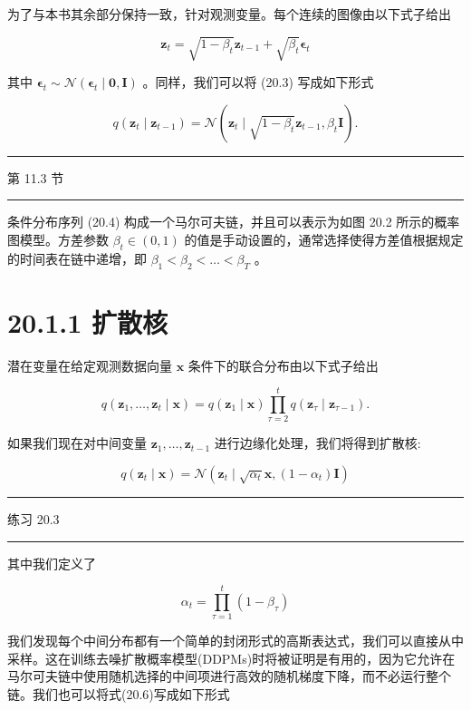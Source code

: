 \documentclass[10pt]{report}
\newcommand{\HRule}{\begin{center}\rule{0.9\linewidth}{0.2mm}\end{center}}
\begin{document}
为了与本书其余部分保持一致，针对观测变量。每个连续的图像由以下式子给出

\[
{\mathbf{z}}_{t} = \sqrt{1 - {\beta }_{t}}{\mathbf{z}}_{t - 1} + \sqrt{{\beta }_{t}}{\mathbf{\epsilon }}_{t} \tag{20.3}
\]

其中 \({\mathbf{\epsilon }}_{t} \sim  \mathcal{N}\left( {{\mathbf{\epsilon }}_{t} \mid  \mathbf{0},\mathbf{I}}\right)\) 。同样，我们可以将 (20.3) 写成如下形式

\[
q\left( {{\mathbf{z}}_{t} \mid  {\mathbf{z}}_{t - 1}}\right)  = \mathcal{N}\left( {{\mathbf{z}}_{t} \mid  \sqrt{1 - {\beta }_{t}}{\mathbf{z}}_{t - 1},{\beta }_{t}\mathbf{I}}\right) . \tag{20.4}
\]

\HRule

第 11.3 节

\HRule

条件分布序列 (20.4) 构成一个马尔可夫链，并且可以表示为如图 20.2 所示的概率图模型。方差参数 \({\beta }_{t} \in  \left( {0,1}\right)\) 的值是手动设置的，通常选择使得方差值根据规定的时间表在链中递增，即 \({\beta }_{1} < {\beta }_{2} < \ldots  < {\beta }_{T}\) 。

\section*{20.1.1 扩散核}

潜在变量在给定观测数据向量 \(\mathbf{x}\) 条件下的联合分布由以下式子给出

\[
q\left( {{\mathbf{z}}_{1},\ldots ,{\mathbf{z}}_{t} \mid  \mathbf{x}}\right)  = q\left( {{\mathbf{z}}_{1} \mid  \mathbf{x}}\right) \mathop{\prod }\limits_{{\tau  = 2}}^{t}q\left( {{\mathbf{z}}_{\tau } \mid  {\mathbf{z}}_{\tau  - 1}}\right) . \tag{20.5}
\]

如果我们现在对中间变量 \({\mathbf{z}}_{1},\ldots ,{\mathbf{z}}_{t - 1}\) 进行边缘化处理，我们将得到扩散核:

\[
q\left( {{\mathbf{z}}_{t} \mid  \mathbf{x}}\right)  = \mathcal{N}\left( {{\mathbf{z}}_{t} \mid  \sqrt{{\alpha }_{t}}\mathbf{x},\left( {1 - {\alpha }_{t}}\right) \mathbf{I}}\right)  \tag{20.6}
\]

\HRule

练习 20.3

\HRule

其中我们定义了

\[
{\alpha }_{t} = \mathop{\prod }\limits_{{\tau  = 1}}^{t}\left( {1 - {\beta }_{\tau }}\right)  \tag{20.7}
\]

我们发现每个中间分布都有一个简单的封闭形式的高斯表达式，我们可以直接从中采样。这在训练去噪扩散概率模型(DDPMs)时将被证明是有用的，因为它允许在马尔可夫链中使用随机选择的中间项进行高效的随机梯度下降，而不必运行整个链。我们也可以将式(20.6)写成如下形式
\end{document}
